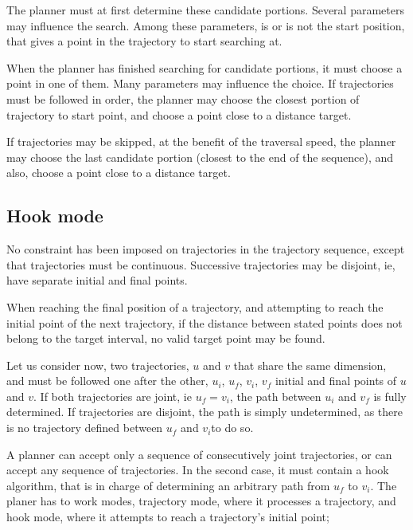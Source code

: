The planner must at first determine these candidate portions. Several parameters may influence the 
search. Among these parameters, is or is not the start position, that gives a point in the trajectory to start
searching at. 

When the planner has finished searching for candidate portions, it must choose a point in one of them. 
Many parameters may influence the choice. If trajectories must be followed in order, the planner may choose
the closest portion of trajectory to start point, and choose a point close to a distance target. 

If trajectories may be skipped, at the benefit of the traversal speed, the planner may choose the last 
candidate portion (closest to the end of the sequence), and also, choose a point close to a distance target.


\subsection{Hook mode}

No constraint has been imposed on trajectories in the trajectory sequence, except that trajectories must be 
continuous. Successive trajectories may be disjoint, ie, have separate initial and final points.

When reaching the final position of a trajectory, and attempting to reach the initial point of the next
trajectory, if the distance between stated points does not belong to the target interval, no valid target
point may be found.




Let us consider now, two trajectories, $u$ and $v$ that share the same dimension, and must be followed one 
after the other, $u_i$, $u_f$, $v_i$, $v_f$ initial and final points of $u$ and $v$.
If both trajectories are joint, ie $u_f = v_i$, the path between $u_i$ and $v_f$ is fully determined.
If trajectories are disjoint, the path is simply undetermined, as there is no trajectory defined between
$u_f$ and $ v_i$to do so.
\newline

A planner can accept only a sequence of consecutively joint trajectories, or can accept any sequence of 
trajectories.
In the second case, it must contain a hook algorithm, that is in charge of determining an arbitrary path
from $u_f$ to $ v_i$.
The planer has to work modes, trajectory mode, where it processes a trajectory, and hook mode, where it 
attempts to reach a trajectory's initial point;

